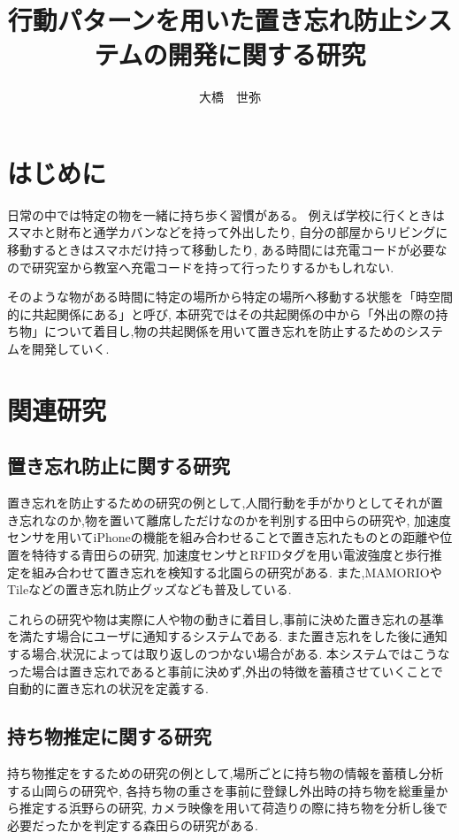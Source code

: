 \documentclass[a4j,8pt,twocolumn]{extarticle}
\title{行動パターンを用いた置き忘れ防止システムの開発に関する研究}
\author{大橋　世弥}
\affiliation{愛知工業大学　情報科学部　情報科学科}
\begin{document}
	
\maketitle
\thispagestyle{empty}	%

\section{はじめに}
日常の中では特定の物を一緒に持ち歩く習慣がある。
例えば学校に行くときはスマホと財布と通学カバンなどを持って外出したり,
自分の部屋からリビングに移動するときはスマホだけ持って移動したり,
ある時間には充電コードが必要なので研究室から教室へ充電コードを持って行ったりするかもしれない.

そのような物がある時間に特定の場所から特定の場所へ移動する状態を「時空間的に共起関係にある」と呼び,
本研究ではその共起関係の中から「外出の際の持ち物」について着目し,物の共起関係を用いて置き忘れを防止するためのシステムを開発していく.



\section{関連研究}

\subsection{置き忘れ防止に関する研究}
置き忘れを防止するための研究の例として,人間行動を手がかりとしてそれが置き忘れなのか,物を置いて離席しただけなのかを判別する田中らの研究や,
加速度センサを用いてiPhoneの機能を組み合わせることで置き忘れたものとの距離や位置を特待する青田らの研究,
加速度センサとRFIDタグを用い電波強度と歩行推定を組み合わせて置き忘れを検知する北園らの研究がある.
また,MAMORIOやTileなどの置き忘れ防止グッズなども普及している.

これらの研究や物は実際に人や物の動きに着目し,事前に決めた置き忘れの基準を満たす場合にユーザに通知するシステムである.
また置き忘れをした後に通知する場合,状況によっては取り返しのつかない場合がある.
本システムではこうなった場合は置き忘れであると事前に決めず,外出の特徴を蓄積させていくことで自動的に置き忘れの状況を定義する.



\subsection{持ち物推定に関する研究}
持ち物推定をするための研究の例として,場所ごとに持ち物の情報を蓄積し分析する山岡らの研究や,
各持ち物の重さを事前に登録し外出時の持ち物を総重量から推定する浜野らの研究,
カメラ映像を用いて荷造りの際に持ち物を分析し後で必要だったかを判定する森田らの研究がある.
\end{document}
